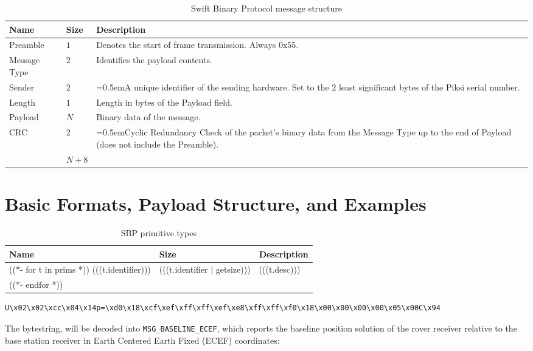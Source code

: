 \documentclass{article}
\numberwithin{table}{subsection}
\numberwithin{field}{subsection}
\begin{document}
\begin{table}[h]
  \centering
  \begin{tabularx}{\textwidth}{aaX}
    \toprule
    Name & Size & Description \\
    \midrule
    {Preamble} & $1$ & Denotes the start of frame transmission. Always 0x55. \\
    {Message Type} & $2$ & Identifies the payload contents. \\
    {Sender} & $2$ & \hangindent=0.5em{A unique identifier of the sending hardware. Set to the 2 least significant bytes of the Piksi serial number.} \\
    {Length} & $1$ & Length in bytes of the {Payload} field. \\
    {Payload} & $N$ & Binary data of the message. \\
    {CRC} & $2$ & \hangindent=0.5em{Cyclic Redundancy Check of the packet's binary data from the Message Type up to the end of Payload (does not include the Preamble).} \\
    \midrule
    & $N+8$ \\
    \bottomrule
  \end{tabularx}
  \caption{Swift Binary Protocol message structure}
  \label{tab:message}
\end{table}
\newpage
\section{Basic Formats, Payload Structure, and Examples}
\label{sec:Payload}

\begin{table}[h]
  \centering
  \begin{tabularx}{0.60\textwidth}{aaX}
    \toprule
    Name & Size & Description \\
    \midrule
    ((*- for t in prims *))
    (((t.identifier))) & (((t.identifier | getsize))) & (((t.desc))) \\
    ((*- endfor *))
    \bottomrule
  \end{tabularx}
  \caption{SBP primitive types}
  \label{tab:types}
\end{table}

\begin{verbatim}
U\x02\x02\xcc\x04\x14p=\xd0\x18\xcf\xef\xff\xff\xef\xe8\xff\xff\xf0\x18\x00\x00\x00\x00\x05\x00C\x94
\end{verbatim}

The bytestring, will be decoded into \texttt{MSG\_BASELINE\_ECEF},
which reports the baseline position solution of the rover receiver
relative to the base station receiver in Earth Centered Earth Fixed
(ECEF) coordinates:
\end{document}
